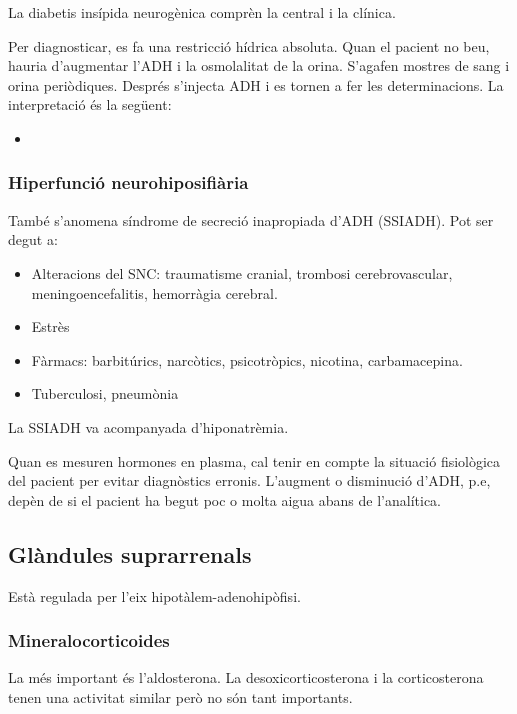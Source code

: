 La diabetis insípida neurogènica comprèn la central i la clínica.

Per diagnosticar, es fa una restricció hídrica absoluta. Quan el
pacient no beu, hauria d'augmentar l'ADH i la osmolalitat de la
orina. S'agafen mostres de sang i orina periòdiques. Després s'injecta
ADH i es tornen a fer les determinacions. La interpretació és la
següent:
\begin{itemize}
\item 
\end{itemize}

\subsubsection{Hiperfunció neurohiposifiària}
\label{sec:hiperf}
També s'anomena síndrome de secreció inapropiada d'ADH (SSIADH). Pot
ser degut a:
\begin{itemize}
\item Alteracions del SNC: traumatisme cranial, trombosi
  cerebrovascular, meningoencefalitis, hemorràgia cerebral.
\item Estrès
\item Fàrmacs: barbitúrics, narcòtics, psicotròpics, nicotina, carbamacepina.
\item Tuberculosi, pneumònia
\end{itemize}

La SSIADH va acompanyada d'hiponatrèmia.

Quan es mesuren hormones en plasma, cal tenir en compte la situació
fisiològica del pacient per evitar diagnòstics erronis. L'augment o
disminució d'ADH, p.e, depèn de si el pacient ha begut poc o molta
aigua abans de l'analítica.

\subsection{Glàndules suprarrenals}
\label{sec:gland-supr}

Està regulada per l'eix hipotàlem-adenohipòfisi. 


\subsubsection{Mineralocorticoides}
\label{sec:mineralocorticoides}

La més important és l'aldosterona. La desoxicorticosterona i la
corticosterona tenen una activitat similar però no són tant
importants.

